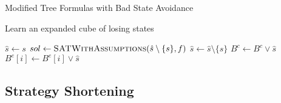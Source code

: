 \begin{algorithm}
    \caption{Modified Tree Formulas with Bad State Avoidance}
    \label{alg:treeFormulaLearning}
    \begin{algorithmic}[1]
        \State {}
        \Else
        \State {}
        \EndIf
        \EndFunction
    \end{algorithmic}

    \begin{algorithmic}[1]
        \State {}
        \Else
        \State {}
        \EndIf
        \EndFunction
    \end{algorithmic}
\end{algorithm}

\begin{algorithm}
    \caption{Learn an expanded cube of losing states}
    \label{alg:boundedLearning}
    \begin{algorithmic}
            \State $ \hat{s} \gets s$
            \State $sol \gets \Call{SATWithAssumptions}{\hat{s} \setminus \{ s \}, f}$
                    \State $\hat{s} \gets \hat{s} \setminus \{ s \}$
                \EndIf
            \EndFor
                \State $B^c \gets B^c \lor \hat{s}$
            \Else
                    \State $B^e[i] \gets B^e[i] \lor \hat{s}$
                \EndFor
            \EndIf
        \EndFunction
    \end{algorithmic}
\end{algorithm}

\subsection{Strategy Shortening}

